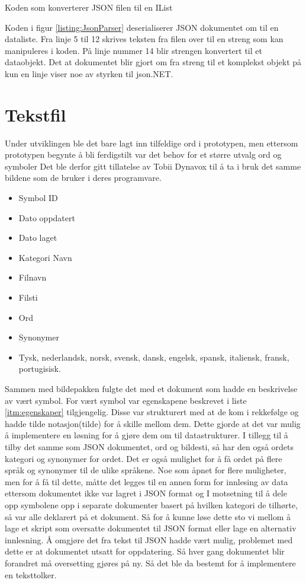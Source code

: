 \begin{listing}[ht] 
\inputminted[fontsize=\footnotesize, frame=lines,framesep=2mm,baselinestretch=1.2,bgcolor=lightgray,linenos]{csharp}{Code/JSONparser.cs} 
\caption{Koden som konverterer JSON filen til en IList} 
\label{listing:JsonParser} 
\end{listing} 


Koden i figur \ref{listing:JsonParser} deserialiserer JSON dokumentet om til en dataliste. Fra linje 5 til 12 skrives teksten fra filen over til en streng som kan manipuleres i koden. På linje nummer 14 blir strengen konvertert til et dataobjekt. Det at dokumentet blir gjort om fra streng til et komplekst objekt på kun en linje viser noe av styrken til json.NET. 


\section{Tekstfil}

Under utviklingen ble det bare lagt inn tilfeldige ord i prototypen, men ettersom prototypen begynte å bli ferdigstilt var det behov for et større utvalg ord og symboler Det ble derfor gitt tillatelse av Tobii Dynavox til å ta i bruk det samme bildene som de bruker i deres programvare. 

\begin{itemize}
\label{itm:egenskaper}
\item Symbol ID
\item Dato oppdatert
\item Dato laget
\item Kategori Navn 
\item Filnavn
\item Filsti
\item Ord
\item Synonymer
\item Tysk, nederlandsk, norsk, svensk, dansk, engelsk, spansk, italiensk, fransk, portugisisk.
\end{itemize}


Sammen med bildepakken fulgte det med et dokument som hadde en beskrivelse av vært symbol. For vært symbol var egenskapene beskrevet i liste \ref{itm:egenskaper} tilgjengelig. Disse var strukturert med at de kom i rekkefølge og hadde tilde notasjon(tilde) for å skille mellom dem. Dette gjorde at det var mulig å implementere en løsning for å gjøre dem om til datastrukturer. I tillegg til å tilby det samme som JSON dokumentet, ord og bildesti, så har den også ordets kategori og synonymer for ordet. Det er også mulighet for å få ordet på flere språk og synonymer til de ulike språkene. Noe som åpnet for flere muligheter, men for å få til dette, måtte det legges til en annen form for innlesing av data ettersom dokumentet ikke var lagret i JSON format og I motsetning til å dele opp symbolene opp i separate dokumenter basert på hvilken kategori de tilhørte, så var alle deklarert på et dokument. Så for å kunne løse dette sto vi mellom å lage et skript som oversatte dokumentet til JSON format eller lage en alternativ innlesning. Å omgjøre det fra tekst til JSON hadde vært mulig, problemet med dette er at dokumentet utsatt for oppdatering. Så hver gang dokumentet blir forandret må oversetting gjøres på ny. Så det ble da bestemt for å implementere en teksttolker. 

